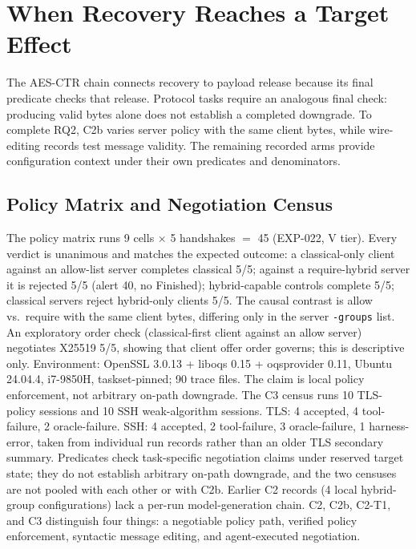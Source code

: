 \section{When Recovery Reaches a Target Effect}
\label{sec:targetsres}
The AES-CTR chain connects recovery to payload release because its final
predicate checks that release. Protocol tasks require an analogous final
check: producing valid bytes alone does not establish a completed downgrade.
To complete RQ2, C2b varies server policy with the same client bytes, while
wire-editing records test message validity. The remaining recorded arms
provide configuration context under their own predicates and denominators.
\subsection{Policy Matrix and Negotiation Census}\label{sec:c2b}
The policy matrix runs 9 cells $\times$ 5 handshakes $=$ 45 (EXP-022, V
tier). Every verdict is unanimous and matches the expected outcome: a
classical-only client against an allow-list server completes classical 5/5;
against a require-hybrid server it is rejected 5/5 (alert 40, no Finished);
hybrid-capable controls complete 5/5; classical servers reject hybrid-only
clients 5/5. The causal contrast is allow vs.\ require with the same client
bytes, differing only in the server \texttt{-groups} list. An exploratory
order check (classical-first client against an allow server) negotiates
X25519 5/5, showing that client offer order governs; this is descriptive only.
Environment: OpenSSL 3.0.13 + liboqs 0.15 + oqsprovider 0.11, Ubuntu 24.04.4,
i7-9850H, taskset-pinned; 90 trace files. The claim is local policy
enforcement, not arbitrary on-path downgrade.
The C3 census runs 10 TLS-policy sessions and 10 SSH weak-algorithm sessions.
TLS: 4 accepted, 4 tool-failure, 2 oracle-failure. SSH: 4 accepted, 2
tool-failure, 3 oracle-failure, 1 harness-error, taken from individual run
records rather than an older TLS secondary summary. Predicates check
task-specific negotiation claims under reserved target state; they do not
establish arbitrary on-path downgrade, and the two censuses are not pooled
with each other or with C2b. Earlier C2 records (4 local hybrid-group
configurations) lack a per-run model-generation chain. C2, C2b, C2-T1, and C3
distinguish four things: a negotiable policy path, verified policy
enforcement, syntactic message editing, and agent-executed negotiation.
